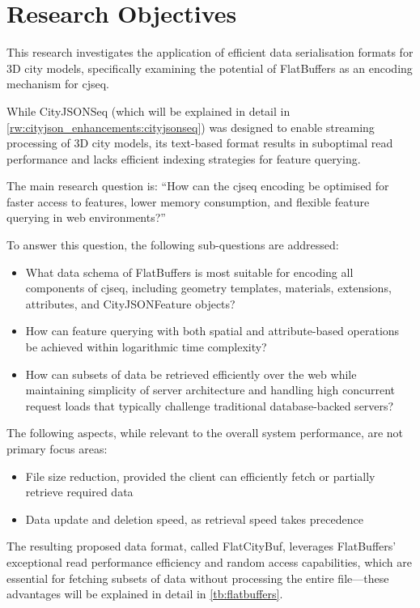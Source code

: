 
\section{Research Objectives}
\label{introduction:research_objectives}
This research investigates the application of efficient data serialisation formats for 3D city models, specifically examining the potential of FlatBuffers \citep{flatbuffers} as an encoding mechanism for \ac{cjseq}.

While CityJSONSeq (which will be explained in detail in \autoref{rw:cityjson_enhancements:cityjsonseq}) was designed to enable streaming processing of 3D city models, its text-based format results in suboptimal read performance and lacks efficient indexing strategies for feature querying.

The main research question is:
``How can the \ac{cjseq} encoding be optimised for faster access to features, lower memory consumption, and flexible feature querying in web environments?''

To answer this question, the following sub-questions are addressed:
\begin{itemize}
  \item What data schema of FlatBuffers is most suitable for encoding all components of \ac{cjseq}, including geometry templates, materials, extensions, attributes, and CityJSONFeature objects?
  \item How can feature querying with both spatial and attribute-based operations be achieved within logarithmic time complexity?
  \item How can subsets of data be retrieved efficiently over the web while maintaining simplicity of server architecture and handling high concurrent request loads that typically challenge traditional database-backed servers?
\end{itemize}

The following aspects, while relevant to the overall system performance, are not primary focus areas:
\begin{itemize}
  \item File size reduction, provided the client can efficiently fetch or partially retrieve required data
  \item Data update and deletion speed, as retrieval speed takes precedence
\end{itemize}

The resulting proposed data format, called FlatCityBuf, leverages FlatBuffers' exceptional read performance efficiency and random access capabilities, which are essential for fetching subsets of data without processing the entire file—these advantages will be explained in detail in \autoref{tb:flatbuffers}.

